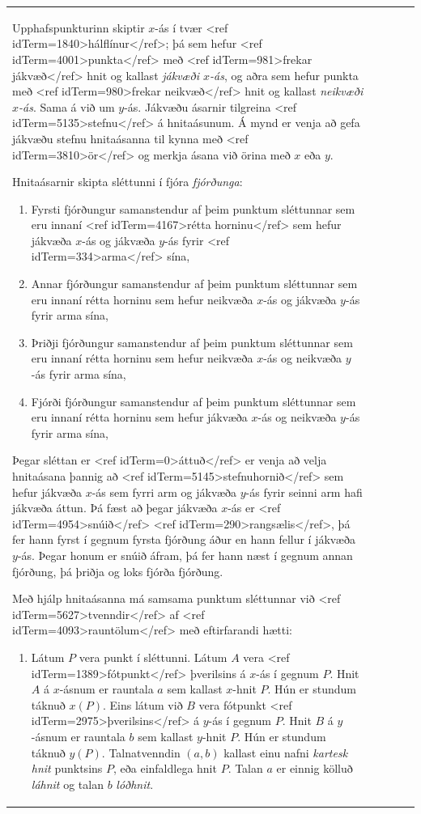\begin{longtable}{p{}|p{}|p{}|p{}|p{}}
Upphafspunkturinn skiptir $x$-ás í tvær <ref idTerm=1840>hálflínur</ref>; þá sem hefur <ref idTerm=4001>punkta</ref> með <ref idTerm=981>frekar jákvæð</ref> hnit og kallast \textit{jákvæði $x$-ás}, og aðra sem hefur punkta með <ref idTerm=980>frekar neikvæð</ref> hnit og kallast \textit{neikvæði $x$-ás}. Sama á við um $y$-ás. Jákvæðu ásarnir tilgreina <ref idTerm=5135>stefnu</ref> á hnitaásunum. Á mynd er venja að gefa jákvæðu stefnu hnitaásanna til kynna með <ref idTerm=3810>ör</ref> og merkja ásana við örina með $x$ eða $y$.

Hnitaásarnir skipta sléttunni í fjóra \textit{fjórðunga}:

\begin{enumerate}
    \item Fyrsti fjórðungur samanstendur af þeim punktum sléttunnar sem eru innaní <ref idTerm=4167>rétta horninu</ref> sem hefur jákvæða $x$-ás og jákvæða $y$-ás fyrir <ref idTerm=334>arma</ref> sína,

    \item Annar fjórðungur samanstendur af þeim punktum sléttunnar sem eru innaní rétta horninu sem hefur neikvæða $x$-ás og jákvæða $y$-ás fyrir arma sína,

    \item Þriðji fjórðungur samanstendur af þeim punktum sléttunnar sem eru innaní rétta horninu sem hefur neikvæða $x$-ás og neikvæða $y$-ás fyrir arma sína,

    \item Fjórði fjórðungur samanstendur af þeim punktum sléttunnar sem eru innaní rétta horninu sem hefur jákvæða $x$-ás og neikvæða $y$-ás fyrir arma sína,
\end{enumerate}

Þegar sléttan er <ref idTerm=0>áttuð</ref> er venja að velja hnitaásana þannig að <ref idTerm=5145>stefnuhornið</ref> sem hefur jákvæða $x$-ás sem fyrri arm og jákvæða $y$-ás fyrir seinni arm hafi jákvæða áttun. Þá fæst að þegar jákvæða $x$-ás er <ref idTerm=4954>snúið</ref> <ref idTerm=290>rangsælis</ref>, þá fer hann fyrst í gegnum fyrsta fjórðung áður en hann fellur í jákvæða $y$-ás. Þegar honum er snúið áfram, þá fer hann næst í gegnum annan fjórðung, þá þriðja og loks fjórða fjórðung.

Með hjálp hnitaásanna má samsama punktum sléttunnar við <ref idTerm=5627>tvenndir</ref> af <ref idTerm=4093>rauntölum</ref> með eftirfarandi hætti:

\begin{enumerate}
    \item Látum $P$ vera punkt í sléttunni. Látum $A$ vera <ref idTerm=1389>fótpunkt</ref> þverilsins á $x$-ás í gegnum $P$. Hnit $A$ á $x$-ásnum er rauntala $a$ sem kallast $x$-hnit $P$. Hún er stundum táknuð $x(P)$. Eins látum við $B$ vera fótpunkt <ref idTerm=2975>þverilsins</ref> á $y$-ás í gegnum $P$. Hnit $B$ á $y$-ásnum er rauntala $b$ sem kallast $y$-hnit $P$. Hún er stundum táknuð $y(P)$. Talnatvenndin $(a,b)$ kallast einu nafni \textit{kartesk hnit} punktsins $P$, eða einfaldlega hnit $P$. Talan $a$ er einnig kölluð \textit{láhnit} og talan $b$ \textit{lóðhnit}.


\end{enumerate}
\end{longtable}
